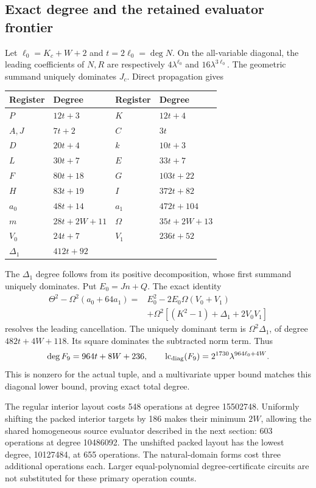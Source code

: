 \subsection{Exact degree and the retained evaluator frontier}
Let $\ell_0=K_c+W+2$ and $t=2\ell_0=\deg N$. On the all-variable
diagonal, the leading coefficients of $N,R$ are respectively
$4\lambda^{\ell_0}$ and $16\lambda^{3\ell_0}$. The geometric summand
uniquely dominates $J_c$. Direct propagation gives
\begin{center}\small
\begin{tabular}{ll@{\qquad}ll}
\toprule
Register&Degree&Register&Degree\\\midrule
$P$&$12t+3$&$K$&$12t+4$\\
$A,J$&$7t+2$&$C$&$3t$\\
$D$&$20t+4$&$k$&$10t+3$\\
$L$&$30t+7$&$E$&$33t+7$\\
$F$&$80t+18$&$G$&$103t+22$\\
$H$&$83t+19$&$I$&$372t+82$\\
$a_0$&$48t+14$&$a_1$&$472t+104$\\
$m$&$28t+2W+11$&$\Omega$&$35t+2W+13$\\
$V_0$&$24t+7$&$V_1$&$236t+52$\\
$\Delta_1$&$412t+92$&&\\\bottomrule
\end{tabular}
\end{center}
The $\Delta_1$ degree follows from its positive decomposition, whose first
summand uniquely dominates. Put $E_0=Jn+Q$. The exact identity
\[
\begin{split}
\Theta^2-\Omega^2(a_0+64a_1)
={}&E_0^2-2E_0\Omega(V_0+V_1)\\
&+\Omega^2[(K^2-1)+\Delta_1+2V_0V_1]
\end{split}
\]
resolves the leading cancellation. The uniquely dominant term is
$\Omega^2\Delta_1$, of degree $482t+4W+118$. Its square dominates the
subtracted norm term. Thus
\[
 \deg F_9=964t+8W+236,
 \qquad\operatorname{lc}_{\rm diag}(F_9)=2^{1730}\lambda^{964\ell_0+4W}.
\]
This is nonzero for the actual tuple, and a multivariate upper bound matches
this diagonal lower bound, proving exact total degree.

The regular interior layout costs 548 operations at degree 15502748.
Uniformly shifting the packed interior targets by 186 makes their minimum
$2W$, allowing the shared homogeneous source evaluator described in the next
section: 603 operations at degree 10486092. The unshifted packed layout has
the lowest degree, 10127484, at 655 operations. The natural-domain forms cost
three additional operations each. Larger equal-polynomial degree-certificate
circuits are not substituted for these primary operation counts.
